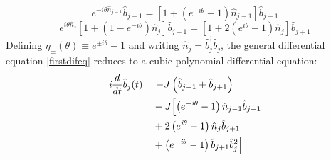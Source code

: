 \begin{equation} 
e^{-i\theta \hat{n}_{j-1}} \hat{b}_{j-1} = \left[ 1 + \left(e^{-i\theta} - 1\right)\hat{n}_{j-1} \right] \hat{b}_{j-1}
\end{equation}
\begin{equation} 
e^{i\theta \hat{n}_j}\left[1 + (1 - e^{-i\theta})\hat{n}_j\right] \hat{b}_{j+1} = \left[ 1 + 2\left(e^{i\theta} - 1\right)\hat{n}_j \right] \hat{b}_{j+1}
\end{equation} 
Defining $\eta_\pm(\theta) \equiv e^{\pm i\theta} - 1$ and writing $\hat{n}_j = \hat{b}_j^\dagger \hat{b}_j$, the general differential equation \eqref{firstdifeq} reduces to a cubic polynomial differential equation:
\begin{equation}
\begin{split}
\textit{i} \frac{d}{dt} \hat{b}_j(t) &= -J \left( \hat{b}_{j-1} + \hat{b}_{j+1} \right) \\
&\quad - J \Bigl[ \left( e^{-\textit{i} \theta} - 1 \right)\hat{n}_{j-1} \hat{b}_{j-1} \\
&\quad + 2 \left( e^{\textit{i} \theta} - 1 \right) \hat{n}_j \hat{b}_{j+1} \\
&\quad + \left( e^{-\textit{i} \theta} - 1 \right) \hat{b}_{j+1} \hat{b}_j^2 \Bigr]
\end{split}
\end{equation}
